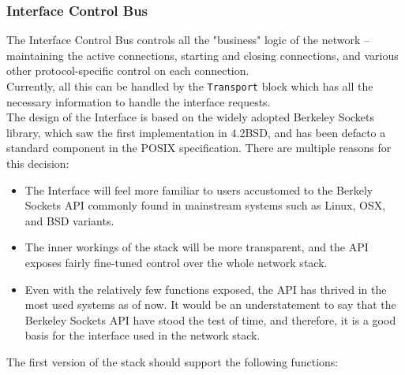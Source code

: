 \subsubsection{Interface Control Bus}
The Interface Control Bus controls all the "business" logic of the network -- 
maintaining the active connections, starting and closing connections, and various
other protocol-specific control on each connection.\\ 
Currently, all this can be handled by the \texttt{Transport} block which has all 
the necessary information to handle the interface requests.\\
The design of the Interface is based on the widely adopted Berkeley Sockets library,
which saw the first implementation in 4.2BSD, and has been defacto a standard 
component in the POSIX specification\cite{tcpip_illustrated_vol2}. There are 
multiple reasons for this decision:
\begin{itemize}
\item The Interface will feel more familiar to users accustomed to the Berkely 
Sockets API commonly found in mainstream systems such as Linux, OSX, and BSD 
variants.

\item The inner workings of the stack will be more transparent, and the API 
exposes fairly fine-tuned control over the whole network stack.

\item Even with the relatively few functions exposed, the API
has thrived in the most used systems as of now. It would be an understatement to 
say that the Berkeley Sockets API have stood the test of time, and therefore, it
is a good basis for the interface used in the network stack.

\end{itemize}

The first version of the stack should support the following functions:

